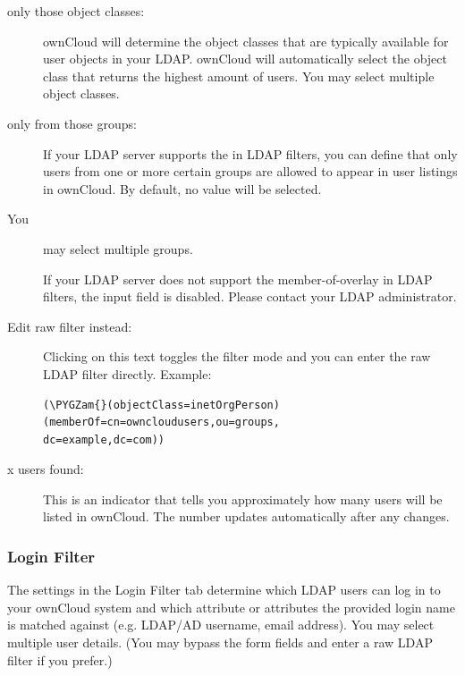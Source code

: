 \documentclass[letterpaper,10pt,english]{sphinxmanual}
\def\PYGZam{\char`\&}
\begin{document}
\begin{description}
\item[{only those object classes:}] \leavevmode
ownCloud will determine the object classes that are typically available for
user objects in your LDAP. ownCloud will automatically select the object
class that returns the highest amount of users. You may select multiple
object classes.

\item[{only from those groups:}] \leavevmode
If your LDAP server supports the  in LDAP filters, you
can define that only users from one or more certain groups are allowed to
appear in user listings in ownCloud. By default, no value will be selected.

\item[{You}] \leavevmode
may select multiple groups.

If your LDAP server does not support the member-of-overlay in LDAP filters,
the input field is disabled. Please contact your LDAP administrator.

\item[{Edit raw filter instead:}] \leavevmode
Clicking on this text toggles the filter mode and you can enter the raw LDAP
filter directly. Example:

\begin{Verbatim}[commandchars=\\\{\}]
(\PYGZam{}(objectClass=inetOrgPerson)(memberOf=cn=owncloudusers,ou=groups,
dc=example,dc=com))
\end{Verbatim}

\item[{x users found:}] \leavevmode
This is an indicator that tells you approximately how many users will be
listed in ownCloud. The number updates automatically after any changes.

\end{description}


\subsubsection{Login Filter}
\label{configuration_user/user_auth_ldap:login-filter}
The settings in the Login Filter tab determine which LDAP users can log in to
your ownCloud system and which attribute or attributes the provided login name
is matched against (e.g. LDAP/AD username, email address). You may select
multiple user details. (You may bypass the form fields and enter a raw LDAP
filter if you prefer.)
\end{document}
